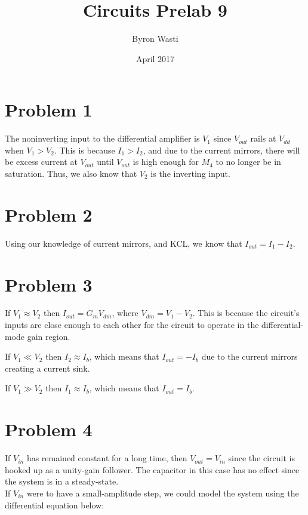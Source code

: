 \documentclass{article}
\title{Circuits Prelab 9}
\author{Byron Wasti}
\date{April 2017}
\begin{document}
\maketitle

\section{Problem 1}

    The noninverting input to the differential amplifier is $V_1$ since $V_{out}$ rails at $V_{dd}$ when $V_1 > V_2$. This is because $I_1 > I_2$, and due to the current mirrors, there will be excess current at $V_{out}$ until $V_{out}$ is high enough for $M_4$ to no longer be in saturation. Thus, we also know that $V_2$ is the inverting input.


\section{Problem 2}

    Using our knowledge of current mirrors, and KCL, we know that $I_{out} = I_1 - I_2$.

\section{Problem 3}

    If $V_1 \approx V_2$ then $I_{out} = G_mV_{dm}$, where $V_{dm} = V_1 - V_2$. This is because the circuit's inputs are close enough to each other for the circuit to operate in the differential-mode gain region.

    If $V_1 \ll V_2$ then $I_2 \approx I_b$, which means that $I_{out} = -I_b$ due to the current mirrors creating a current sink.

    If $V_1 \gg V_2$ then $I_1 \approx I_b$, which means that $I_{out} = I_b$.


\section{Problem 4}

    If $V_{in}$ has remained constant for a long time, then $V_{out} = V_{in}$ since the circuit is hooked up as a unity-gain follower. The capacitor in this case has no effect since the system is in a steady-state.\\

    If $V_{in}$ were to have a small-amplitude step, we could model the system using the differential equation below:
\end{document}
